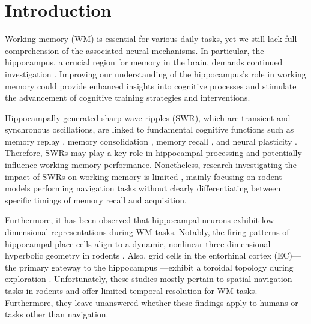 \section{Introduction}
Working memory (WM) is essential for various daily tasks, yet we still lack full comprehension of the associated neural mechanisms. In particular, the hippocampus, a crucial region for memory in the brain, demands continued investigation \cite{scoville_loss_1957,squire_legacy_2009,boran_persistent_2019,kaminski_persistently_2017,kornblith_persistent_2017,faraut_dataset_2018,borders_hippocampus_2022,li_functional_2023,dimakopoulos_information_2022}. Improving our understanding of the hippocampus's role in working memory could provide enhanced insights into cognitive processes and stimulate the advancement of cognitive training strategies and interventions. 

\indent
Hippocampally-generated sharp wave ripples (SWR), which are transient and synchronous oscillations, are linked to fundamental cognitive functions such as memory replay \cite{wilson_reactivation_1994,nadasdy_replay_1999,lee_memory_2002,davidson_hippocampal_2009}, memory consolidation \cite{girardeau_selective_2009,ego-stengel_disruption_2010,fernandez-ruiz_long-duration_2019,kim_corticalhippocampal_2022}, memory recall \cite{wu_hippocampal_2017,norman_hippocampal_2019,norman_hippocampal_2021}, and neural plasticity \cite{behrens_induction_2005,norimoto_hippocampal_2018}. Therefore, SWRs may play a key role in hippocampal processing and potentially influence working memory performance. Nonetheless, research investigating the impact of SWRs on working memory is limited \cite{jadhav_awake_2012}, mainly focusing on rodent models performing navigation tasks without clearly differentiating between specific timings of memory recall and acquisition.

\indent
Furthermore, it has been observed that hippocampal neurons exhibit low-dimensional representations during WM tasks. Notably, the firing patterns of hippocampal place cells \cite{okeefe_hippocampus_1971,okeefe_place_1976,ekstrom_cellular_2003,kjelstrup_finite_2008,harvey_intracellular_2009,royer_control_2012} align to a dynamic, nonlinear three-dimensional hyperbolic geometry in rodents \cite{zhang_hippocampal_2022}. Also, grid cells in the entorhinal cortex (EC)—the primary gateway to the hippocampus \cite{naber_reciprocal_2001,van_strien_anatomy_2009,strange_functional_2014}—exhibit a toroidal topology during exploration \cite{gardner_toroidal_2022}. Unfortunately, these studies mostly pertain to spatial navigation tasks in rodents and offer limited temporal resolution for WM tasks. Furthermore, they leave unanswered whether these findings apply to humans or tasks other than navigation.

